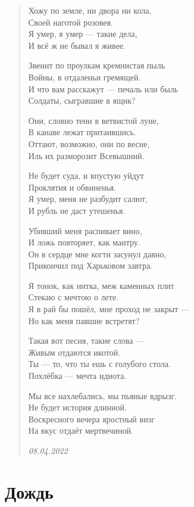 \begin{verse}

Хожу по земле, ни двора ни кола,\\
Своей наготой розовея.\\
Я умер, я умер --- такие дела,\\
И всё ж не бывал я живее.

Звенит по проулкам кремнистая пыль\\
Войны, в отдаленьи гремящей.\\
И что вам расскажут --- печаль или быль\\
Солдаты, сыгравшие в ящик?

Они, словно тени в ветвистой луне,\\
В канаве лежат притаившись.\\
Оттают, возможно, они по весне,\\
Иль их разморозит Всевышний.

Не будет суда, и впустую уйдут\\
Проклятия и обвиненья.\\
Я умер, меня не разбудит салют,\\
И рубль не даст утешенья.

Убивший меня распивает вино,\\
И ложь повторяет, как мантру.\\
Он в сердце мне когти засунул давно,\\
Прикончил под Харьковом завтра.

Я тонок, как нитка, меж каменных плит\\
Стекаю с мечтою о лете.\\
Я в рай бы пошёл, мне проход не закрыт ---\\
Но как меня павшие встретят?

Такая вот песня, такие слова ---\\
Живым отдаются икотой.\\
Ты --- то, что ты ешь с голубого стола.\\
Похлёбка --- мечта идиота.

Мы все нахлебались, мы пьяные вдрызг.\\
Не будет история длинной.\\
Воскресного вечера яростный визг\\
На вкус отдаёт мертвечиной.

\emph{08.04.2022}
\end{verse}

\newpage
\section{Дождь}

